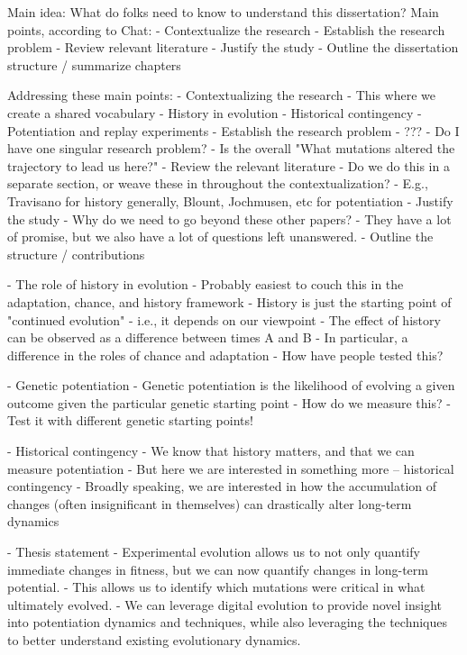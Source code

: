 Main idea: What do folks need to know to understand this dissertation? 
Main points, according to Chat: 
    - Contextualize the research
    - Establish the research problem
    - Review relevant literature
    - Justify the study
    - Outline the dissertation structure / summarize chapters

Addressing these main points: 
    - Contextualizing the research
        - This where we create a shared vocabulary
            - History in evolution
            - Historical contingency
            - Potentiation and replay experiments
        - Establish the research problem 
            - ???
                - Do I have one singular research problem?
                - Is the overall "What mutations altered the trajectory to lead us here?"
        - Review the relevant literature
            - Do we do this in a separate section, or weave these in throughout the contextualization? 
                - E.g., Travisano for history generally, Blount, Jochmusen, etc for potentiation
        - Justify the study
            - Why do we need to go beyond these other papers? 
                - They have a lot of promise, but we also have a lot of questions left unanswered. 
        - Outline the structure / contributions

- The role of history in evolution
    - Probably easiest to couch this in the adaptation, chance, and history framework
        - History is just the starting point of "continued evolution" 
            - i.e., it depends on our viewpoint
        - The effect of history can be observed as a difference between times A and B
            - In particular, a difference in the roles of chance and adaptation
    - How have people tested this? 

- Genetic potentiation
    - Genetic potentiation is the likelihood of evolving a given outcome given the particular genetic starting point
    - How do we measure this? 
        - Test it with different genetic starting points!

- Historical contingency
    - We know that history matters, and that we can measure potentiation
    - But here we are interested in something more -- historical contingency
        - Broadly speaking, we are interested in how the accumulation of changes (often insignificant in themselves) can drastically alter long-term dynamics

- Thesis statement
    - Experimental evolution allows us to not only quantify immediate changes in fitness, but we can now quantify changes in long-term potential. 
        - This allows us to identify which mutations were critical in what ultimately evolved. 
    - We can leverage digital evolution to provide novel insight into potentiation dynamics and techniques, while also leveraging the techniques to better understand existing evolutionary dynamics. 

